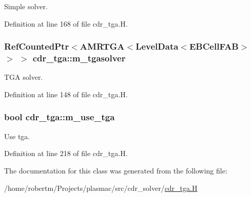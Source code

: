 Simple solver. 



Definition at line 168 of file cdr\+\_\+tga.\+H.

\subsubsection[{\texorpdfstring{m\+\_\+tgasolver}{m_tgasolver}}]{\setlength{\rightskip}{0pt plus 5cm}Ref\+Counted\+Ptr$<$A\+M\+R\+T\+GA$<$Level\+Data$<$E\+B\+Cell\+F\+AB$>$ $>$ $>$ cdr\+\_\+tga\+::m\+\_\+tgasolver\hspace{0.3cm}{\ttfamily [protected]}}\hypertarget{classcdr__tga_aec60f3a7d5ba0a02cbf860bd309f0988}{}\label{classcdr__tga_aec60f3a7d5ba0a02cbf860bd309f0988}


T\+GA solver. 



Definition at line 148 of file cdr\+\_\+tga.\+H.

\subsubsection[{\texorpdfstring{m\+\_\+use\+\_\+tga}{m_use_tga}}]{\setlength{\rightskip}{0pt plus 5cm}bool cdr\+\_\+tga\+::m\+\_\+use\+\_\+tga\hspace{0.3cm}{\ttfamily [protected]}}\hypertarget{classcdr__tga_a57c77b2e62a80b8752a7b04f868ca474}{}\label{classcdr__tga_a57c77b2e62a80b8752a7b04f868ca474}


Use tga. 



Definition at line 218 of file cdr\+\_\+tga.\+H.



The documentation for this class was generated from the following file\+:\begin{DoxyCompactItemize}
\item 
/home/robertm/\+Projects/plasmac/src/cdr\+\_\+solver/\hyperlink{cdr__tga_8H}{cdr\+\_\+tga.\+H}\end{DoxyCompactItemize}
